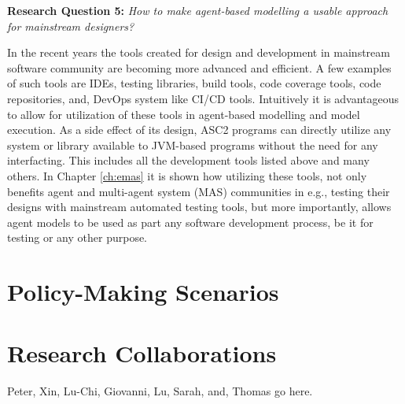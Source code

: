 \textbf{Research Question 5:} \textit{How to make agent-based modelling a usable approach for mainstream designers?}

In the recent years the tools created for design and development in mainstream software community are becoming more advanced and efficient. A few examples of such tools are IDEs, testing libraries, build tools, code coverage tools, code repositories, and, DevOps system like CI/CD tools. Intuitively it is advantageous to allow for utilization of these tools in agent-based modelling and model execution. As a side effect of its design, ASC2 programs can directly utilize any system or library available to JVM-based programs without the need for any interfacting. This includes all the development tools listed above and many others. In Chapter \ref{ch:emas} it is shown how utilizing these tools, not only benefits agent and multi-agent system (MAS) communities in e.g., testing their designs with mainstream automated testing tools, but more importantly, allows agent models to be used as part any software development process, be it for testing or any other purpose.




\section{Policy-Making Scenarios}


\section{Research Collaborations}
Peter, Xin, Lu-Chi, Giovanni, Lu, Sarah, and, Thomas go here.